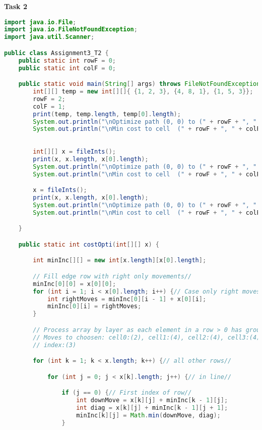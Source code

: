 \documentclass[11pt]{article}
\begin{document}
\begin{enumerate}
\pagebreak
\textbf{Task 2}
\begin{lstlisting}[language=Java]
import java.io.File;
import java.io.FileNotFoundException;
import java.util.Scanner;

public class Assignment3_T2 {
    public static int rowF = 0;
    public static int colF = 0;

    public static void main(String[] args) throws FileNotFoundException {
        int[][] temp = new int[][]{ {1, 2, 3}, {4, 8, 1}, {1, 5, 3}};
        rowF = 2;
        colF = 1;
        print(temp, temp.length, temp[0].length);
        System.out.println("\nOptimize path (0, 0) to (" + rowF + ", " + colF + ")\n");
        System.out.println("\nMin cost to cell  (" + rowF + ", " + colF + ") : " + costOpti(temp)+"\n");
        
        
        int[][] x = fileInts();
        print(x, x.length, x[0].length);
        System.out.println("\nOptimize path (0, 0) to (" + rowF + ", " + colF + ")\n");
        System.out.println("\nMin cost to cell  (" + rowF + ", " + colF + ") : " + costOpti(x)+"\n");

        x = fileInts();
        print(x, x.length, x[0].length);
        System.out.println("\nOptimize path (0, 0) to (" + rowF + ", " + colF + ")\n");
        System.out.println("\nMin cost to cell  (" + rowF + ", " + colF + ") : " + costOpti(x)+"\n");

    }

    public static int costOpti(int[][] x) {

        int minInc[][] = new int[x.length][x[0].length];

        // Fill edge row with right only movements//
        minInc[0][0] = x[0][0];
        for (int i = 1; i < x[0].length; i++) {// Case only right moves: Top//
            int rightMoves = minInc[0][i - 1] + x[0][i];
            minInc[0][i] = rightMoves;
        }

        // Process array by layer as each element in a row > 0 has group of
        // Moves to choosen: cell0:(2), cell1:(4), cell2:(4), cell3:(4), ..., Last
        // index:(3)

        for (int k = 1; k < x.length; k++) {// all other rows//

            for (int j = 0; j < x[k].length; j++) {// in line//

                if (j == 0) {// First index of row//
                    int downMove = x[k][j] + minInc[k - 1][j];
                    int diag = x[k][j] + minInc[k - 1][j + 1];
                    minInc[k][j] = Math.min(downMove, diag);
                }


\end{lstlisting}
\end{enumerate}
\end{document}

